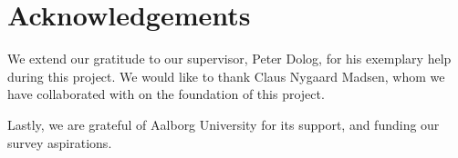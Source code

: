 \section{Acknowledgements}
We extend our gratitude to our supervisor, Peter Dolog, for his exemplary help during this project.
We would like to thank Claus Nygaard Madsen, whom we have collaborated with on the foundation of this project.

Lastly, we are grateful of Aalborg University for its support, and funding our survey aspirations.